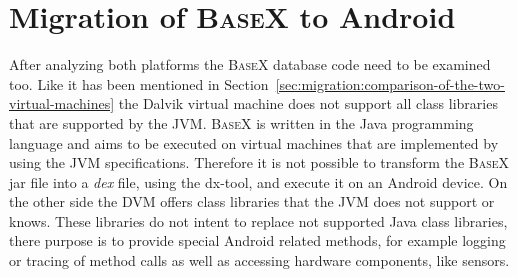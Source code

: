 \section{Migration of \textsc{BaseX} to Android}
\label{sec:migration:migration-of-basex-to-android}
After analyzing both platforms the \textsc{BaseX} database code need to be examined too.
Like it has been mentioned in Section~\ref{sec:migration:comparison-of-the-two-virtual-machines} the Dalvik virtual machine does not support all class libraries that are supported by the JVM.
\textsc{BaseX} is written in the Java programming language and aims to be executed on virtual machines that are implemented by using the JVM specifications.
Therefore it is not possible to transform the \textsc{BaseX} jar file into a \textit{dex} file, using the dx-tool, and execute it on an Android device.
On the other side the DVM offers class libraries that the JVM does not support or knows.
These libraries do not intent to replace not supported Java class libraries, there purpose is to provide special Android related methods, for example logging or tracing of method calls as well as accessing hardware components, like sensors. 

